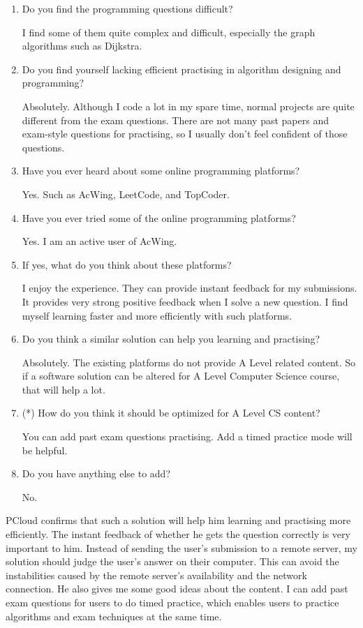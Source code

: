 \documentclass[a4paper]{report}
\begin{document}
\begin{enumerate}
    \item Do you find the programming questions difficult?

    I find some of them quite complex and difficult, especially the graph algorithms such as Dijkstra.

    \item Do you find yourself lacking efficient practising in algorithm designing and programming?

    Absolutely. Although I code a lot in my spare time, normal projects are quite different from the exam questions. There are not many past papers and exam-style questions for practising, so I usually don't feel confident of those questions.

    \item Have you ever heard about some online programming platforms?

    Yes. Such as AcWing, LeetCode, and TopCoder.

    \item Have you ever tried some of the online programming platforms?

    Yes. I am an active user of AcWing.

    \item If yes, what do you think about these platforms?

    I enjoy the experience. They can provide instant feedback for my submissions. It provides very strong positive feedback when I solve a new question. I find myself learning faster and more efficiently with such platforms.

    \item Do you think a similar solution can help you learning and practising?

    Absolutely. The existing platforms do not provide A Level related content. So if a software solution can be altered for A Level Computer Science course, that will help a lot.

    \item (*) How do you think it should be optimized for A Level CS content?

    You can add past exam questions practising. Add a timed practice mode will be helpful.

    \item Do you have anything else to add?

    No.
\end{enumerate}

PCloud confirms that such a solution will help him learning and practising more efficiently. The instant feedback of whether he gets the question correctly is very important to him. Instead of sending the user's submission to a remote server, my solution should judge the user's answer on their computer. This can avoid the instabilities caused by the remote server's availability and the network connection. He also gives me some good ideas about the content. I can add past exam questions for users to do timed practice, which enables users to practice algorithms and exam techniques at the same time.
\end{document}

